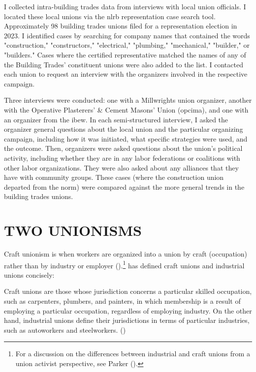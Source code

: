 \documentclass[12pt]{article}
\renewenvironment{quote}
  {\list{}{\leftmargin=\parindent\rightmargin=0pt}%
   \item\relax}
  {\endlist}
\begin{document}
I collected intra-building trades data from interviews with local union officials. I located these local unions via the \acrfull{nlrb} representation case search tool. Approximately 98 building trades unions filed for a representation election in 2023. I identified cases by searching for company names that contained the words "construction," "constructors," "electrical," "plumbing," "mechanical," "builder," or "builders." Cases where the certified representative matched the names of any of the Building Trades’ constituent unions were also added to the list. I contacted each union to request an interview with the organizers involved in the respective campaign. 

Three interviews were conducted: one with a Millwrights union organizer, another with the Operative Plasterers' \& Cement Masons' Union (\acrshort{opcima}), and one with an organizer from the \acrfull{ibew}. In each semi-structured interview, I asked the organizer general questions about the local union and the particular organizing campaign, including how it was initiated, what specific strategies were used, and the outcome. Then, organizers were asked questions about the union's political activity, including whether they are in any labor federations or coalitions with other labor organizations. They were also asked about any alliances that they have with community groups. These cases (where the construction union departed from the norm) were compared against the more general trends in the building trades unions.

\section{TWO UNIONISMS}\label{craft_vs_industrial}

Craft unionism is when workers are organized into a union by craft (occupation) rather than by industry or employer (\cite[97]{suffernCraftVsIndustrial1936}).\footnote{For a discussion on the differences between industrial and craft unions from a union activist perspective, see Parker (\citeyear{parkerAreIndustrialUnions2008}).} \citeauthor{ohCraftIndustrialUnions1989} has defined craft unions and industrial unions concisely:

\begin{quote}
Craft unions are those whose jurisdiction concerns a particular skilled occupation, such as carpenters, plumbers, and painters, in which membership is a result of employing a particular occupation, regardless of employing industry. On the other hand, industrial unions define their jurisdictions in terms of particular industries, such as autoworkers and steelworkers. (\citeyear[2]{ohCraftIndustrialUnions1989})
\end{quote}
\end{document}

